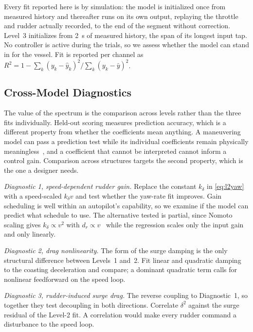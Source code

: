 \documentclass[conference]{IEEEtran}
\begin{document}
Every fit reported here is by simulation: the model is initialized once from measured history and thereafter runs on its own output, replaying the throttle and rudder actually recorded, to the end of the segment without correction. Level~3 initializes from 2~s of measured history, the span of its longest input tap. No controller is active during the trials, so we assess whether the model can stand in for the vessel. Fit is reported per channel as $R^2 = 1-\sum_k(y_k-\hat y_k)^2/\sum_k(y_k-\bar y)^2$.

\subsection{Cross-Model Diagnostics}

The value of the spectrum is the comparison across levels rather than the three fits individually. Held-out scoring measures prediction accuracy, which is a different property from whether the coefficients mean anything. A maneuvering model can pass a prediction test while its individual coefficients remain physically meaningless~\cite{alexandersson2022system}, and a coefficient that cannot be interpreted cannot inform a control gain. Comparison across structures targets the second property, which is the one a designer needs. 

\emph{Diagnostic 1, speed-dependent rudder gain.} Replace the constant $k_\delta$ in \eqref{eq:l2yaw} with a speed-scaled $k_\delta v$ and test whether the yaw-rate fit improves. Gain scheduling is well within an autopilot's capability, so we examine if the model can predict what schedule to use. The alternative tested is partial, since Nomoto scaling gives $k_\delta\propto v^2$ with $d_r\propto v$~\cite{fossen2011handbook} while the regression scales only the input gain and only linearly.

\emph{Diagnostic 2, drag nonlinearity.} The form of the surge damping is the only structural difference between Levels~1 and~2. Fit linear and quadratic damping to the coasting deceleration and compare; a dominant quadratic term calls for nonlinear feedforward on the speed loop.

\emph{Diagnostic 3, rudder-induced surge drag.} The reverse coupling to Diagnostic~1, so together they test decoupling in both directions. Correlate $\delta^2$ against the surge residual of the Level-2 fit. A correlation would make every rudder command a disturbance to the speed loop.
\end{document}
